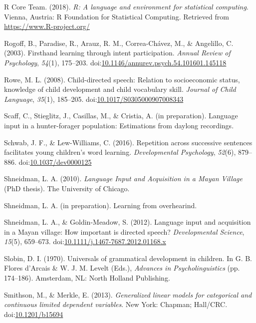 \documentclass[,man,floatsintext]{apa6}
\begin{document}
\hypertarget{ref-R-base}{}
R Core Team. (2018). \emph{R: A language and environment for statistical
computing}. Vienna, Austria: R Foundation for Statistical Computing.
Retrieved from \url{https://www.R-project.org/}

\hypertarget{ref-rogoff2003firsthand}{}
Rogoff, B., Paradise, R., Arauz, R. M., Correa-Chávez, M., \& Angelillo,
C. (2003). Firsthand learning through intent participation. \emph{Annual
Review of Psychology}, \emph{54}(1), 175--203.
doi:\href{https://doi.org/10.1146/annurev.psych.54.101601.145118}{10.1146/annurev.psych.54.101601.145118}

\hypertarget{ref-rowe2008child}{}
Rowe, M. L. (2008). Child-directed speech: Relation to socioeconomic
status, knowledge of child development and child vocabulary skill.
\emph{Journal of Child Language}, \emph{35}(1), 185--205.
doi:\href{https://doi.org/10.1017/S0305000907008343}{10.1017/S0305000907008343}

\hypertarget{ref-scaffIPlanguage}{}
Scaff, C., Stieglitz, J., Casillas, M., \& Cristia, A. (in preparation).
Language input in a hunter-forager population: Estimations from daylong
recordings.

\hypertarget{ref-schwab2016repetition}{}
Schwab, J. F., \& Lew-Williams, C. (2016). Repetition across successive
sentences facilitates young children's word learning.
\emph{Developmental Psychology}, \emph{52}(6), 879--886.
doi:\href{https://doi.org/10.1037/dev0000125}{10.1037/dev0000125}

\hypertarget{ref-shneidman2010language}{}
Shneidman, L. A. (2010). \emph{Language Input and Acquisition in a Mayan
Village} (PhD thesis). The University of Chicago.

\hypertarget{ref-shneidmanIPoverhearing}{}
Shneidman, L. A. (in preparation). Learning from overhearind.

\hypertarget{ref-shneidman2012language}{}
Shneidman, L. A., \& Goldin-Meadow, S. (2012). Language input and
acquisition in a Mayan village: How important is directed speech?
\emph{Developmental Science}, \emph{15}(5), 659--673.
doi:\href{https://doi.org/10.1111/j.1467-7687.2012.01168.x}{10.1111/j.1467-7687.2012.01168.x}

\hypertarget{ref-slobin1970universals}{}
Slobin, D. I. (1970). Universals of grammatical development in children.
In G. B. Flores d'Arcais \& W. J. M. Levelt (Eds.), \emph{Advances in
Psycholinguistics} (pp. 174--186). Amsterdam, NL: North Holland
Publishing.

\hypertarget{ref-smithson2013generalized}{}
Smithson, M., \& Merkle, E. (2013). \emph{Generalized linear models for
categorical and continuous limited dependent variables}. New York:
Chapman; Hall/CRC.
doi:\href{https://doi.org/10.1201/b15694}{10.1201/b15694}
\end{document}
